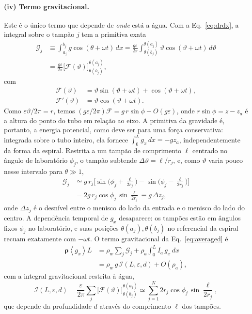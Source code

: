 \documentclass[aps,pre,twocolumn,superscriptaddress,nofootinbib,floatfix]{revtex4-2}
\newcommand{\avg}[1]{\left\langle #1 \right\rangle}
\begin{document}
\paragraph*{(iv) Termo gravitacional.} Este é o único termo que depende de \emph{onde} está a água. Com a Eq.~\eqref{eq:drdx}, a integral sobre o tampão $j$ tem a primitiva exata
\begin{align}
  \mathcal G_j &\equiv \int_{a_j}^{b_j} g\cos(\theta+\omega t)\,dx
  = \frac{g\varepsilon}{2\pi}\int_{\theta(b_j)}^{\theta(a_j)}\vartheta\cos(\vartheta+\omega t)\,d\vartheta \nonumber\\
  &= \frac{g\varepsilon}{2\pi}\Big[\mathcal F(\vartheta)\Big]_{\theta(b_j)}^{\theta(a_j)},
  \label{eq:Gj}
\end{align}
com
\begin{align}
  \mathcal F(\vartheta) &= \vartheta\sin(\vartheta+\omega t) + \cos(\vartheta+\omega t), \nonumber\\
  \mathcal F'(\vartheta) &= \vartheta\cos(\vartheta+\omega t).
  \label{eq:Fprim}
\end{align}
Como $\varepsilon\vartheta/2\pi=r$, temos $(g\varepsilon/2\pi)\mathcal F=g\,r\sin\phi+O(g\varepsilon)$, onde $r\sin\phi=z-z_a$ é a altura do ponto do tubo em relação ao eixo. A primitiva da gravidade é, portanto, a energia potencial, como deve ser para uma força conservativa: integrada sobre o tubo inteiro, ela fornece $\int_0^Lg_x\,dx=-gz_a$, independentemente da forma da espiral. Restrita a um tampão de comprimento $\ell$ centrado no ângulo de laboratório $\phi_j$, o tampão subtende $\Delta\vartheta=\ell/r_j$, e, como $\vartheta$ varia pouco nesse intervalo para $\theta\gg1$,
\begin{align}
  \mathcal G_j &\simeq g\,r_j\Big[\sin\!\big(\phi_j+\tfrac{\ell}{2r_j}\big)-\sin\!\big(\phi_j-\tfrac{\ell}{2r_j}\big)\Big] \nonumber\\
  &= 2g\,r_j\cos\phi_j\,\sin\frac{\ell}{2r_j} \equiv g\,\Delta z_j ,
  \label{eq:dz}
\end{align}
onde $\Delta z_j$ é o desnível entre o menisco do lado da entrada e o menisco do lado do centro. A dependência temporal de $g_x$ desaparece: os tampões estão em ângulos fixos $\phi_j$ no laboratório, e suas posições $\theta(a_j),\theta(b_j)$ no referencial da espiral recuam exatamente com $-\omega t$. O termo gravitacional da Eq.~\eqref{eq:averaged} é
\begin{align}
  \bm\rho\avg{g_x}L &= \rho_w\sum_j\mathcal G_j + \rho_a\!\int_0^L I_a\,g_x\,dx \nonumber\\
  &= \rho_w\,g\,\mathcal I(L,\varepsilon,d) + O(\rho_a),
  \label{eq:term_g}
\end{align}
com a integral gravitacional restrita à água,
\begin{equation}
  \mathcal I(L,\varepsilon,d) = \frac{\varepsilon}{2\pi}\sum_j\Big[\mathcal F(\vartheta)\Big]_{\theta(b_j)}^{\theta(a_j)}
  \simeq \sum_{j=1}^{N}2r_j\cos\phi_j\,\sin\frac{\ell}{2r_j},
  \label{eq:Ical}
\end{equation}
que depende da profundidade $d$ através do comprimento $\ell$ dos tampões.
\end{document}
